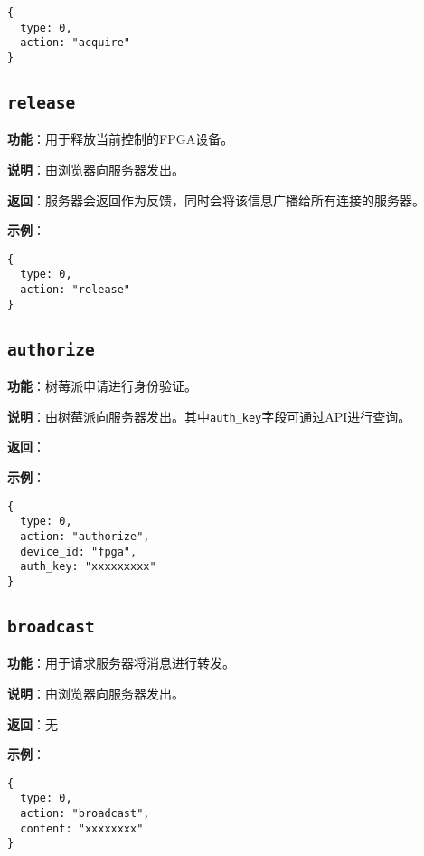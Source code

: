 \documentclass{article}
\begin{document}
\begin{lstlisting}[style=json]
{
  type: 0,
  action: "acquire"
}
\end{lstlisting}

\subsection{\texttt{release}}
\label{act:release}

\noindent\textbf{功能}：用于释放当前控制的FPGA设备。

\noindent\textbf{说明}：由浏览器向服务器发出。

\noindent\textbf{返回}：服务器会返回\texttt{}作为反馈，同时会将该信息广播给所有连接的服务器。

\noindent\textbf{示例}：

\begin{lstlisting}[style=json]
{
  type: 0,
  action: "release"
}
\end{lstlisting}

\subsection{\texttt{authorize}}
\label{act:authorize}

\noindent\textbf{功能}：树莓派申请进行身份验证。

\noindent\textbf{说明}：由树莓派向服务器发出。其中\texttt{auth\_key}字段可通过API进行查询。

\noindent\textbf{返回}：

\noindent\textbf{示例}：

\begin{lstlisting}[style=json]
{
  type: 0,
  action: "authorize",
  device_id: "fpga",
  auth_key: "xxxxxxxxx"
}
\end{lstlisting}

\subsection{\texttt{broadcast}}
\label{act:broadcast}

\noindent\textbf{功能}：用于请求服务器将消息进行转发。

\noindent\textbf{说明}：由浏览器向服务器发出。

\noindent\textbf{返回}：无

\noindent\textbf{示例}：

\begin{lstlisting}[style=json]
{
  type: 0,
  action: "broadcast",
  content: "xxxxxxxx"
}
\end{lstlisting}
\end{document}
